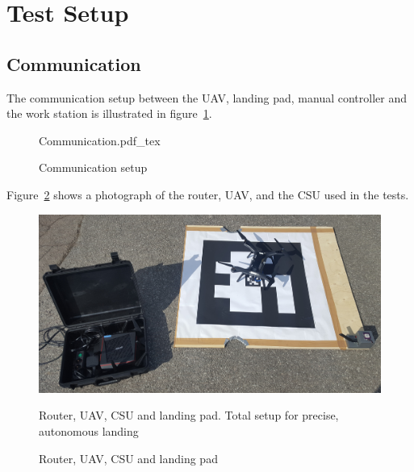 \section{Test Setup} %
\label{sec:test_setup}


\subsection{Communication} %
\label{sub:communication}
The communication setup between the \gls{UAV}, landing pad, manual controller and the work station is illustrated in figure~\ref{fig:comSetupFig}.
\begin{figure}[ht]
    \centering
    {Communication.pdf_tex}
    \caption{Communication setup}
    \label{fig:comSetupFig}
\end{figure}
Figure~\ref{fig:comSetup} shows a photograph of the router, \gls{UAV}, and the \gls{CSU} used in the tests.
\begin{figure}[ht]
  \begin{center}
    \includegraphics[width=\linewidth]{img/communication.jpg}
        \caption{Router, UAV, CSU and landing pad}{Router, UAV, CSU and landing pad. Total setup for precise, autonomous landing}
        \label{fig:comSetup}
  \end{center}
\end{figure}


